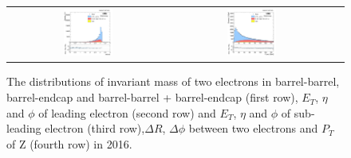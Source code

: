 \begin{figure}[ht]
\begin{center}
\begin{tabular}{ccc}
      \includegraphics[width=0.32\textwidth]{figures/Zprime/2016/complementary/h_Dphi_ll.png}&
      \includegraphics[width=0.32\textwidth]{figures/Zprime/2016/complementary/h_Ptll.png}\\
    \end{tabular}
    \caption{The distributions of invariant mass of two electrons in barrel-barrel, barrel-endcap and barrel-barrel + barrel-endcap (first row), $E_{T}$, $\eta$ and $\phi$ of leading electron (second row) and $E_{T}$, $\eta$ and $\phi$ of sub-leading electron (third row),$\Delta R$, $\Delta\phi$ between two electrons and $P_{T}$ of Z (fourth row) in 2016.
    \label{fig:complementary_2016}}
  \end{center}
\end{figure}


